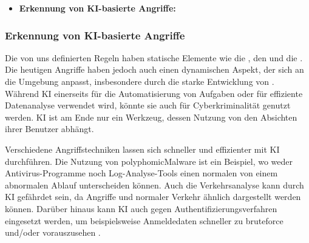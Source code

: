 \begin{itemize}[noitemsep]
    \item \textbf{Erkennung von \gls{KI}-basierte Angriffe:}
\end{itemize}
\subsubsection{Erkennung von \gls{KI}-basierte Angriffe}

Die von uns definierten Regeln haben statische Elemente wie die , den  und die . Die heutigen Angriffe haben jedoch auch einen dynamischen Aspekt, der sich an die Umgebung anpasst, insbesondere durch die starke Entwicklung von  \citep{Guembe_AIHACKER}. Während \gls{KI} einerseits für die Automatisierung von Aufgaben oder für effiziente Datenanalyse verwendet wird, könnte sie auch für Cyberkriminalität genutzt werden. \gls{KI} ist am Ende nur ein Werkzeug, dessen Nutzung von den Absichten ihrer Benutzer abhängt.

Verschiedene Angriffstechniken lassen sich schneller und effizienter mit \gls{KI} durchführen. Die Nutzung von \gls{polyphomicMalware} ist ein Beispiel, wo weder Antivirus-Programme noch Log-Analyse-Tools einen normalen von einem abnormalen Ablauf unterscheiden können. Auch die Verkehrsanalyse kann durch \gls{KI} gefährdet sein, da Angriffe und normaler Verkehr ähnlich dargestellt werden können. Darüber hinaus kann \gls{KI} auch gegen Authentifizierungsverfahren eingesetzt werden, um beispielsweise Anmeldedaten schneller zu \gls{bruteforce} und/oder vorauszusehen \citep{Fritsch_AIcybersec}.



 



